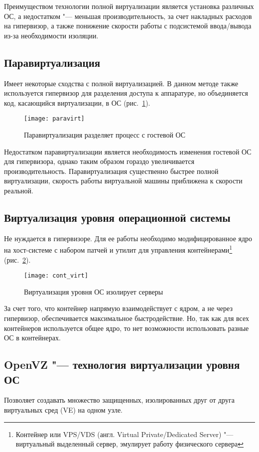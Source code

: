 Преимуществом технологии полной виртуализации является установка различных ОС, а недостатком "--- меньшая производительность, за счет накладных расходов на гипервизор, а также понижение скорости работы с подсистемой ввода/вывода из-за необходимости изоляции.

\subsection{Паравиртуализация}
Имеет некоторые сходства с полной виртуализацией. 
В данном методе также используется гипервизор для разделения доступа к аппаратуре, но объединяется код, касающийся виртуализации, в ОС \cite{virtuallinux} (рис.~\ref{pic:paravirt}).
\begin{figure}[ht]
    \centering
	\texttt{[image: paravirt]}
	\caption{Паравиртуализация разделяет процесс с гостевой ОС}\label{pic:paravirt}
\end{figure}

Недостатком паравиртуализации является необходимость изменения гостевой ОС для гипервизора, однако таким образом гораздо увеличивается производительность.
Паравиртуализация существенно быстрее полной виртуализации, скорость работы виртуальной машины приближена к скорости реальной.

\subsection{Виртуализация уровня операционной системы}
Не нуждается в гипервизоре. 
Для ее работы необходимо модифицированное ядро на хост-системе с набором патчей и утилит для управления контейнерами\footnote{Контейнер или VPS/VDS (англ. Virtual Private/Dedicated Server) "--- виртуальный выделенный сервер, эмулирует работу физического сервера} (рис.~\ref{pic:cont_virt}).
\begin{figure}[ht]
    \centering
	\texttt{[image: cont\_virt]}
	\caption{Виртуализация уровня ОС изолирует серверы}\label{pic:cont_virt}
\end{figure}

За счет того, что контейнер напрямую взаимодействует с ядром, а не через гипервизор, обеспечивается максимальное быстродействие. Но, так как для всех контейнеров используется общее ядро, то нет возможности использовать разные ОС в контейнерах.

\subsection{OpenVZ "--- технология виртуализации уровня ОС}
Позволяет создавать множество защищенных, изолированных друг от друга виртуальных сред (VE) на одном узле. 

